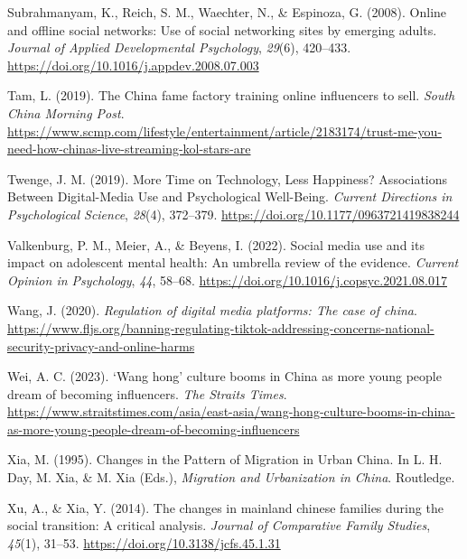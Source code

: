 \documentclass[]{interact}
\theoremstyle{plain}%
\theoremstyle{definition}
\theoremstyle{remark}
\newlength{\cslhangindent}
\newlength{\cslentryspacingunit} %
\newenvironment{CSLReferences}[2] %
 {%
  \setlength{\parindent}{0pt}
  \ifodd #1
  \let\oldpar\par
  \def\par{\hangindent=\cslhangindent\oldpar}
  \fi
  \setlength{\parskip}{#2\cslentryspacingunit}
 }%
 {}
\begin{document}
\begin{CSLReferences}{1}{0}
\leavevmode{}%
Subrahmanyam, K., Reich, S. M., Waechter, N., \& Espinoza, G. (2008).
Online and offline social networks: Use of social networking sites by
emerging adults. \emph{Journal of Applied Developmental Psychology},
\emph{29}(6), 420--433.
\url{https://doi.org/10.1016/j.appdev.2008.07.003}

\leavevmode{}%
Tam, L. (2019). The China fame factory training online influencers to
sell. \emph{South China Morning Post}.
\url{https://www.scmp.com/lifestyle/entertainment/article/2183174/trust-me-you-need-how-chinas-live-streaming-kol-stars-are}

\leavevmode{}%
Twenge, J. M. (2019). More Time on Technology, Less Happiness?
Associations Between Digital-Media Use and Psychological Well-Being.
\emph{Current Directions in Psychological Science}, \emph{28}(4),
372--379. \url{https://doi.org/10.1177/0963721419838244}

\leavevmode{}%
Valkenburg, P. M., Meier, A., \& Beyens, I. (2022). Social media use and
its impact on adolescent mental health: An umbrella review of the
evidence. \emph{Current Opinion in Psychology}, \emph{44}, 58--68.
\url{https://doi.org/10.1016/j.copsyc.2021.08.017}

\leavevmode{}%
Wang, J. (2020). \emph{Regulation of digital media platforms: The case
of china}.
\url{https://www.fljs.org/banning-regulating-tiktok-addressing-concerns-national-security-privacy-and-online-harms}

\leavevmode{}%
Wei, A. C. (2023). {`}Wang hong{'} culture booms in China as more young
people dream of becoming influencers. \emph{The Straits Times}.
\url{https://www.straitstimes.com/asia/east-asia/wang-hong-culture-booms-in-china-as-more-young-people-dream-of-becoming-influencers}

\leavevmode{}%
Xia, M. (1995). Changes in the {Pattern} of {Migration} in {Urban}
{China}. In L. H. Day, M. Xia, \& M. Xia (Eds.), \emph{Migration and
{Urbanization} in {China}}. Routledge.

\leavevmode{}%
Xu, A., \& Xia, Y. (2014). The changes in mainland chinese families
during the social transition: A critical analysis. \emph{Journal of
Comparative Family Studies}, \emph{45}(1), 31--53.
\url{https://doi.org/10.3138/jcfs.45.1.31}

\end{CSLReferences}
\end{document}
